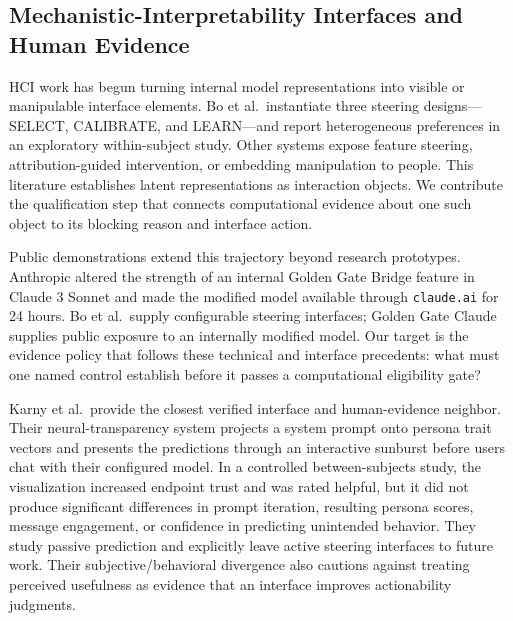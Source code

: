 \documentclass[manuscript,review,anonymous]{acmart}
\begin{document}
\subsection{Mechanistic-Interpretability Interfaces and Human Evidence}\label{mechanistic-interpretability-interfaces-and-human-evidence}

HCI work has begun turning internal model representations into visible or manipulable interface elements. Bo et al.~instantiate three steering designs---SELECT, CALIBRATE, and LEARN---and report heterogeneous preferences in an exploratory within-subject study. \cite{bo2026steerable} {}%
Other systems expose feature steering, attribution-guided intervention, or embedding manipulation to people. \cite{huang2025steering,labarta2026attribution,raval2026latman} {}%
This literature establishes latent representations as interaction objects. We contribute the qualification step that connects computational evidence about one such object to its blocking reason and interface action.

Public demonstrations extend this trajectory beyond research prototypes. Anthropic altered the strength of an internal Golden Gate Bridge feature in Claude 3 Sonnet and made the modified model available through \texttt{claude.ai} for 24 hours. \cite{anthropic2024goldengate} {}%
Bo et al.~supply configurable steering interfaces; Golden Gate Claude supplies public exposure to an internally modified model. Our target is the evidence policy that follows these technical and interface precedents: what must one named control establish before it passes a computational eligibility gate?

Karny et al.~provide the closest verified interface and human-evidence neighbor. Their neural-transparency system projects a system prompt onto persona trait vectors and presents the predictions through an interactive sunburst before users chat with their configured model. In a controlled between-subjects study, the visualization increased endpoint trust and was rated helpful, but it did not produce significant differences in prompt iteration, resulting persona scores, message engagement, or confidence in predicting unintended behavior. \cite{karny2026neural} {}%
They study passive prediction and explicitly leave active steering interfaces to future work. Their subjective/behavioral divergence also cautions against treating perceived usefulness as evidence that an interface improves actionability judgments.
\end{document}

